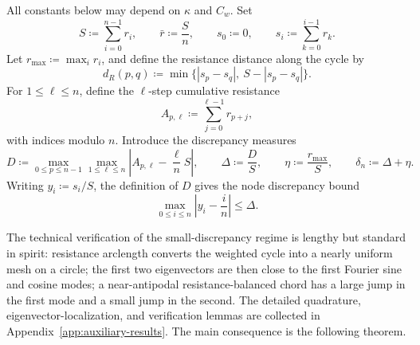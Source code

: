 \documentclass[11pt]{article}
\numberwithin{equation}{section}
\theoremstyle{definition}
\theoremstyle{remark}
\begin{document}
All constants below may depend on $\kappa$ and $C_w$. Set
\[
S\coloneqq \sum_{i=0}^{n-1}r_i,
\qquad
\bar r\coloneqq \frac{S}{n},
\qquad
s_0\coloneqq 0,
\qquad
s_i\coloneqq \sum_{k=0}^{i-1}r_k.
\]
Let $r_{\max}\coloneqq \max_i r_i$, and define the resistance distance
along the cycle by
\[
d_R(p,q)\coloneqq \min\{|s_p-s_q|,\ S-|s_p-s_q|\}.
\]
For $1\le \ell\le n$, define the $\ell$-step cumulative resistance
\[
A_{p,\ell}\coloneqq \sum_{j=0}^{\ell-1}r_{p+j},
\]
with indices modulo $n$. Introduce the discrepancy measures
\begin{equation}\label{eq:def_D}
	D\coloneqq
	\max_{0\le p\le n-1}\max_{1\le \ell\le n}
	\left|A_{p,\ell}-\frac{\ell}{n}S\right|,
	\qquad
	\Delta\coloneqq \frac{D}{S},
	\qquad
	\eta\coloneqq \frac{r_{\max}}{S},
	\qquad
	\delta_n\coloneqq \Delta+\eta.
\end{equation}
Writing $y_i\coloneqq s_i/S$, the definition of $D$ gives the node
discrepancy bound
\begin{equation}\label{eq:node_discrepancy}
	\max_{0\le i\le n}\left|y_i-\frac{i}{n}\right|\le \Delta.
\end{equation}


The technical verification of the small-discrepancy regime is lengthy but standard in spirit: resistance arclength converts the weighted cycle into a nearly uniform mesh on a circle; the first two eigenvectors are then close to the first Fourier sine and cosine modes; a near-antipodal resistance-balanced chord has a large jump in the first mode and a small jump in the second. The detailed quadrature, eigenvector-localization, and verification lemmas are collected in Appendix~\ref{app:auxiliary-results}. The main consequence is the following theorem.
\end{document}
